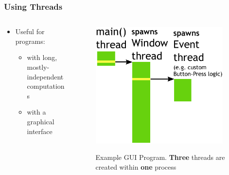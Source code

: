 \documentclass{beamer}
\newcommand{\linespace}{\vskip 0.25cm}
\begin{document}
\begin{frame}
\frametitle{Using Threads}

\begin{columns}
	\begin{column}{0.5\textwidth}
		\begin{itemize}
		
		\linespace
		
		\item Useful for programs:
			\begin{itemize}
  			 \item with long, mostly-independent computations
			 \item with a graphical interface
	  		\end{itemize}
		\end{itemize}
	\end{column}
	
	\begin{column}{0.5\textwidth}
		\begin{figure}
		\includegraphics[width=0.95\textwidth]{Illustrations/ThreadExample_GUI_Part2}
		\label{fig:domains}
		\caption{Example GUI Program. \textbf{Three} threads are created within \textbf{one} process}
		\end{figure}
	\end{column}
\end{columns}

\end{frame}
\end{document}
